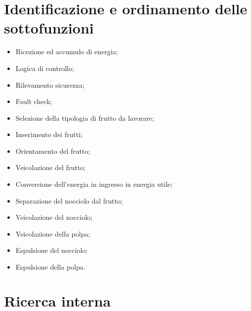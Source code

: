 \documentclass[12pt,a4paper,twoside]{report}  %
\begin{document}
\newpage


\section{Identificazione e ordinamento delle sottofunzioni}

\begin{itemize}
\item Ricezione ed accumulo di energia;
\item Logica di controllo;
\item Rilevamento sicurezza;
\item Fault check;
\item Selezione della tipologia di frutto da lavorare;
\item Inserimento dei frutti;
\item Orientamento del frutto;
\item Veicolazione del frutto;
\item Conversione dell'energia in ingresso in energia utile;
\item Separazione del nocciolo dal frutto;
\item Veicolazione del nocciolo;
\item Veicolazione della polpa;
\item Espulsione del nocciolo;
\item Espulsione della polpa.
\end{itemize}

\section{Ricerca interna}
\end{document}
